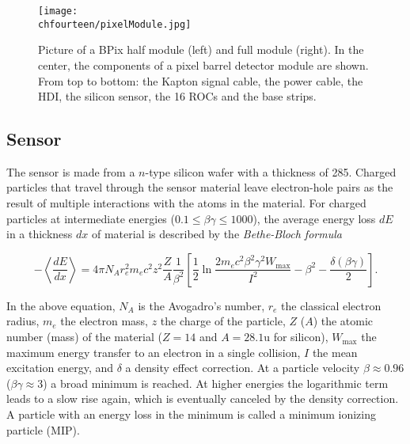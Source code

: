 \begin{figure}[!htb]
 \begin{center}
 \texttt{[image: \\chfourteen/pixelModule.jpg]}
 \end{center}
 \caption{Picture of a BPix half module (left) and full module (right). In the center, the components of a pixel barrel detector module are shown. From top to bottom: the Kapton signal cable, the power cable, the HDI, the silicon sensor, the 16 ROCs and the base strips.}
 \label{fig:BpixMod}
\end{figure}

\subsection{Sensor}

The sensor is made from a $n$-type silicon wafer with a thickness of 285\mum.
Charged particles that travel through the sensor material leave electron-hole pairs as the result of multiple interactions with the atoms in the material.
For charged particles at intermediate energies ($0.1 \leq \beta\gamma \leq 1000$), the average energy loss $dE$ in a thickness $dx$ of material is described by the {\it Bethe-Bloch formula}

\begin{equation}
- \left\langle\frac{dE}{dx}\right\rangle = 4\pi N_Ar_e^2m_ec^2 z^2\frac{Z}{A}\frac{1}{\beta^2}\left[ \frac{1}{2}\ln\frac{2m_ec^2\beta^2\gamma^2W_\mathrm{max}}{I^2} - \beta^2 - \frac{\delta(\beta\gamma)}{2}\right].
\end{equation}

In the above equation, $N_A$ is the Avogadro's number, 
$r_e$ the classical electron radius,
$m_e$ the electron mass,
$z$ the charge of the particle,
$Z$ ($A$) the atomic number (mass) of the material ($Z = 14$ and $A = 28.1$\unit{u} for silicon),
$W_\mathrm{max}$ the maximum energy transfer to an electron in a single collision,
$I$ the mean excitation energy,
and $\delta$ a density effect correction.
At a particle velocity $\beta \approx 0.96$ ($\beta\gamma \approx 3$) a broad minimum is reached. At higher energies the logarithmic term leads to a slow rise again, which is eventually canceled by the density correction. A particle with an energy loss in the minimum is called a minimum ionizing particle (MIP).

